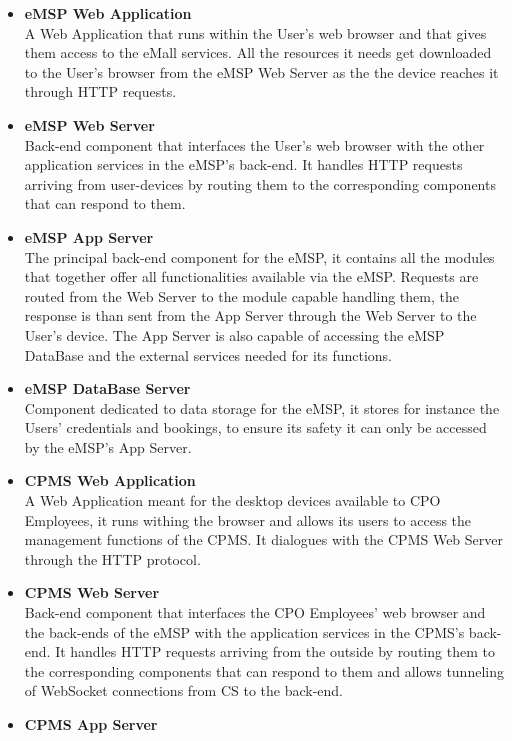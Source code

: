 \documentclass[11pt]{article}
\begin{document}
\begin{itemize}
    \item \textbf{eMSP Web Application} \\
        A Web Application that runs within the User’s web browser and that gives them access to the eMall services. All the resources it needs get downloaded to the User's browser from the eMSP Web Server as the the device reaches it through HTTP requests.
    \item \textbf{eMSP Web Server} \\
        Back-end component that interfaces the User's web browser with the other application services in the eMSP's back-end. It handles HTTP requests arriving from user-devices by routing them to the corresponding components that can respond to them.
    \item \textbf{eMSP App Server} \\
        The principal back-end component for the eMSP, it contains all the modules that together offer all functionalities available via the eMSP. Requests are routed from the Web Server to the module capable handling them, the response is than sent from the App Server through the Web Server to the User's device. The App Server is also capable of accessing the eMSP DataBase and the external services needed for its functions.
    \item \textbf{eMSP DataBase Server} \\
        Component dedicated to data storage for the eMSP, it stores for instance the Users' credentials and bookings, to ensure its safety it can only be accessed by the eMSP's App Server.
    \item \textbf{CPMS Web Application} \\
        A Web Application meant for the desktop devices available to CPO Employees, it runs withing the browser and allows its users to access the management functions of the CPMS. It dialogues with the CPMS Web Server through the HTTP protocol.
    \item \textbf{CPMS Web Server} \\
        Back-end component that interfaces the CPO Employees' web browser and the back-ends of the eMSP with the application services in the CPMS's back-end. It handles HTTP requests arriving from the outside by routing them to the corresponding components that can respond to them and allows tunneling of WebSocket connections from CS to the back-end.
    \item \textbf{CPMS App Server} \\

\end{itemize}
\end{document}
